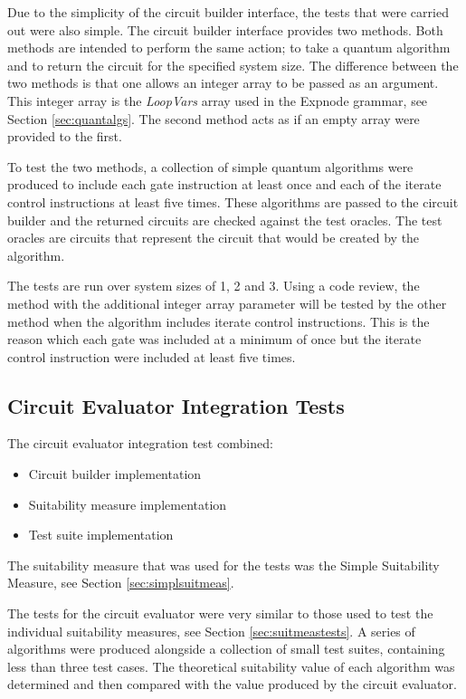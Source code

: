 Due to the simplicity of the circuit builder interface, the tests that were carried out were also simple.
The circuit builder interface provides two methods.
Both methods are intended to perform the same action; to take a quantum algorithm and to return the circuit for the specified system size.
The difference between the two methods is that one allows an integer array to be passed as an argument.
This integer array is the \emph{LoopVars} array used in the Expnode grammar, see Section \ref{sec:quantalgs}.
The second method acts as if an empty array were provided to the first.

To test the two methods, a collection of simple quantum algorithms were produced to include each gate instruction at least once and each of the iterate control instructions at least five times.
These algorithms are passed to the circuit builder and the returned circuits are checked against the test oracles.
The test oracles are circuits that represent the circuit that would be created by the algorithm.

The tests are run over system sizes of 1, 2 and 3.
Using a code review, the method with the additional integer array parameter will be tested by the other method when the algorithm includes iterate control instructions.
This is the reason which each gate was included at a minimum of once but the iterate control instruction were included at least five times.

\subsection{Circuit Evaluator Integration Tests}
\label{sec:cirevaltests}
The circuit evaluator integration test combined:
\begin{itemize}
 \item Circuit builder implementation
 \item Suitability measure implementation
 \item Test suite implementation
\end{itemize}

The suitability measure that was used for the tests was the Simple Suitability Measure, see Section \ref{sec:simplsuitmeas}.

The tests for the circuit evaluator were very similar to those used to test the individual suitability measures, see Section \ref{sec:suitmeastests}.
A series of algorithms were produced alongside a collection of small test suites, containing less than three test cases.
The theoretical suitability value of each algorithm was determined and then compared with the value produced by the circuit evaluator.

